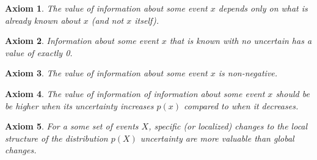 \documentclass[9pt,twocolumn,twoside]{pnas-new}
\newtheorem{axiom}{Axiom}
\begin{document}
\begin{axiom}
    The value of information about some event $x$ depends \textit{only} on what is already known about $x$ (and not $x$ itself).    
    \label{ax:1}
\end{axiom}
\begin{axiom}
    Information about some event $x$ that is known with no uncertain has a value of exactly 0.
    \label{ax:2}
\end{axiom}
\begin{axiom}
    The value of information about some event $x$ is non-negative. 
    \label{ax:3}
\end{axiom}
\begin{axiom}
    The value of information of information about some event $x$ should be be higher when its uncertainty increases $p(x)$ compared to when it decreases.
    \label{ax:4}
\end{axiom}
\begin{axiom}
    For a some set of events $X$, specific (or localized) changes to the local structure of the distribution $p(X)$ uncertainty are more valuable than global changes.
    \label{ax:5}
\end{axiom}
\end{document}
